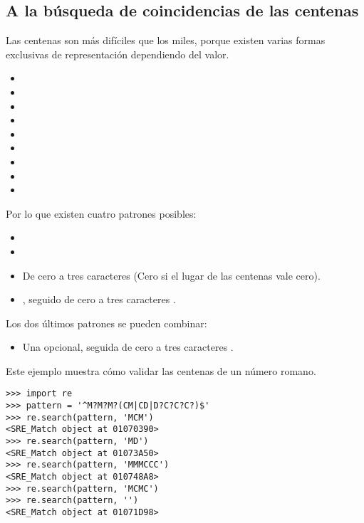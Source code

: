 
\subsection{A la búsqueda de coincidencias de las centenas}

Las centenas son más difíciles que los miles, porque existen varias formas exclusivas de representación dependiendo del valor.

\begin{itemize}

\item {}
\item {}
\item {}
\item {}
\item {}
\item {}
\item {}
\item {}
\item {}

\end{itemize}

Por lo que existen cuatro patrones posibles:


\begin{itemize}

\item {}
\item {}
\item De cero a tres caracteres  (Cero si el lugar de las centenas vale cero).
\item {}, seguido de cero a tres caracteres .

\end{itemize}

Los dos últimos patrones se pueden combinar:

\begin {itemize}
\item Una  opcional, seguida de cero a tres caracteres .
\end {itemize}

Este ejemplo muestra cómo validar las centenas de un número romano.

\noindent\begin{minipage}{\textwidth}
\begin{lstlisting}[mathescape=False]
>>> import re
>>> pattern = '^M?M?M?(CM|CD|D?C?C?C?)$'
>>> re.search(pattern, 'MCM')
<SRE_Match object at 01070390>
>>> re.search(pattern, 'MD')
<SRE_Match object at 01073A50>
>>> re.search(pattern, 'MMMCCC')
<SRE_Match object at 010748A8>
>>> re.search(pattern, 'MCMC')
>>> re.search(pattern, '')
<SRE_Match object at 01071D98>
\end{lstlisting}
\end{minipage}

